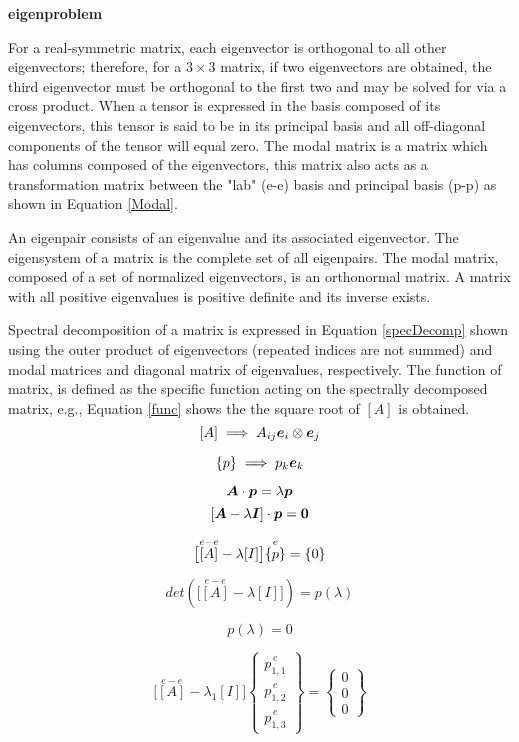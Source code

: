 \documentclass[letterpaper, 10pt, oneside]{article}
\newenvironment{dd}[1]{
	\noindent
	\textbf{\normalsize{#1}}
	\hspace{0.1in}
	\small
	\rmfamily
	}
	{\medskip}
\newcommand{\be}{\begin{equation}}
\newcommand{\ee}{\end{equation}}
\begin{document}
\begin{dd}{eigenproblem}
For a real-symmetric matrix, each eigenvector is orthogonal to all other eigenvectors; therefore, for a $3\times 3$ matrix, if two eigenvectors are obtained, the third eigenvector must be orthogonal to the first two and may be solved for via a cross product.  When a tensor is expressed in the basis composed of its eigenvectors, this tensor is said to be in its principal basis and all off-diagonal components of the tensor will equal zero.  The modal matrix is a matrix which has columns composed of the eigenvectors, this matrix also acts as a transformation matrix between the "lab" (e-e) basis and principal basis (p-p) as shown in Equation \ref{Modal}.

An eigenpair consists of an eigenvalue and its associated eigenvector.  The eigensystem of a matrix is the complete set of all eigenpairs. The modal matrix, composed of a set of normalized eigenvectors, is an orthonormal matrix. A matrix with all positive eigenvalues is positive definite and its inverse exists.

Spectral decomposition of a matrix is expressed in Equation \ref{specDecomp} shown using the outer product of eigenvectors (repeated indices are not summed) and modal matrices and diagonal matrix of eigenvalues, respectively. The function of matrix, is defined as the specific function acting on the spectrally decomposed matrix, e.g., Equation \ref{func} shows the the square root of $[A]$ is obtained.\\

\be{\label{mat}} [A] \implies A_{ij} \bm{e}_i \otimes \bm{e}_j \ee

\be{\label{vec}} \{p\} \implies p_k \bm{e}_k \ee

\be{\label{stdEig}} \bm{A} \cdot \bm{p} = \lambda \bm{p} \ee
\be{\label{stdEig2}} [\bm{A} - \lambda \bm{I}]\cdot \bm{p} = \bm{0} \ee

\be{\label{stdEig3}}\big[ \overset{e-e}{[A]} - \lambda [I] \big]\overset{e}{\{p\}} = \{0\} \ee

\be\label{charPoly} det\left( \Big[ \overset{e-e}{[A]} - \lambda [I] \Big] \right) = p(\lambda) \ee

\be \label{charEqn} p(\lambda) = 0 \ee

\be \Big[ \overset{e-e}{[A]} - \lambda_1 [I] \Big] \begin{Bmatrix} \overset{e}{p_{1,1}} \\ \overset{e}{p_{1,2}} \\ \overset{e}{p_{1,3}} \end{Bmatrix} = \begin{Bmatrix} 0\\0\\0 \end{Bmatrix} \ee


\end{dd}
\end{document}
